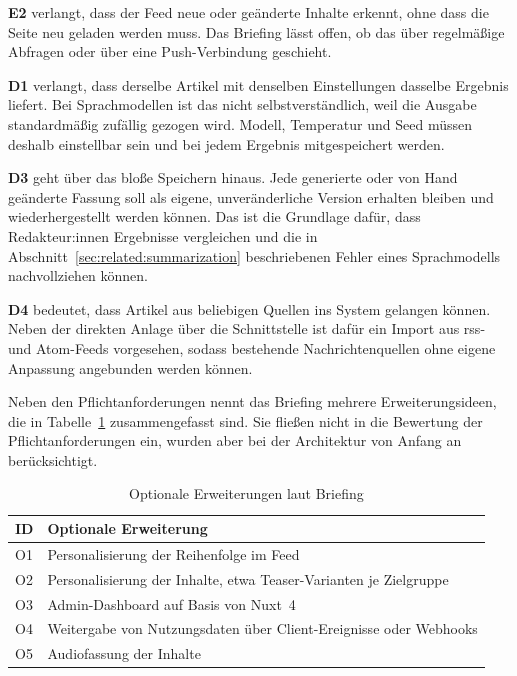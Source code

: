 \textbf{E2} verlangt, dass der Feed neue oder geänderte Inhalte erkennt, ohne dass die Seite neu geladen werden muss.
Das Briefing lässt offen, ob das über regelmäßige Abfragen oder über eine Push-Verbindung geschieht.

\textbf{D1} verlangt, dass derselbe Artikel mit denselben Einstellungen dasselbe Ergebnis liefert.
Bei Sprachmodellen ist das nicht selbstverständlich, weil die Ausgabe standardmäßig zufällig gezogen wird.
Modell, Temperatur und Seed müssen deshalb einstellbar sein und bei jedem Ergebnis mitgespeichert werden.

\textbf{D3} geht über das bloße Speichern hinaus.
Jede generierte oder von Hand geänderte Fassung soll als eigene, unveränderliche Version erhalten bleiben und wiederhergestellt werden können.
Das ist die Grundlage dafür, dass Redakteur:innen Ergebnisse vergleichen und die in Abschnitt~\ref{sec:related:summarization} beschriebenen Fehler eines Sprachmodells nachvollziehen können.

\textbf{D4} bedeutet, dass Artikel aus beliebigen Quellen ins System gelangen können.
Neben der direkten Anlage über die Schnittstelle ist dafür ein Import aus \gls{rss}- und Atom-Feeds vorgesehen, sodass bestehende Nachrichtenquellen ohne eigene Anpassung angebunden werden können.

Neben den Pflichtanforderungen nennt das Briefing mehrere Erweiterungsideen, die in Tabelle~\ref{tab:req:optional} zusammengefasst sind.
Sie fließen nicht in die Bewertung der Pflichtanforderungen ein, wurden aber bei der Architektur von Anfang an berücksichtigt.

\begin{table}
    \centering
    \small
    \begin{tabularx}{\textwidth}{l >{\raggedright\arraybackslash}X}
        \toprule
        \textbf{ID} & \textbf{Optionale Erweiterung} \\
        \midrule
        O1 & Personalisierung der Reihenfolge im Feed \\
        O2 & Personalisierung der Inhalte, etwa Teaser-Varianten je Zielgruppe \\
        O3 & Admin-Dashboard auf Basis von Nuxt~4 \\
        O4 & Weitergabe von Nutzungsdaten über Client-Ereignisse oder Webhooks \\
        O5 & Audiofassung der Inhalte \\
        \bottomrule
    \end{tabularx}
    \caption{Optionale Erweiterungen laut Briefing}
    \label{tab:req:optional}
\end{table}

